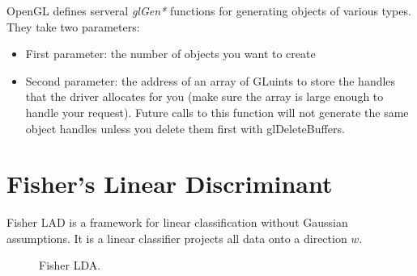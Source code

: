OpenGL defines serveral \textit{glGen*} functions for generating objects of various
types. They take two parameters:
\begin{itemize}
	\item First parameter: the number of objects you want to create
	\item Second parameter: the address of an array of GLuints to store the handles that the driver
	allocates for you (make sure the array is large enough to handle your request). Future calls to this function will not generate the same object handles unless you delete them first with glDeleteBuffers.
\end{itemize} 





\section{Fisher's Linear Discriminant}
 Fisher LAD is a framework for linear classification without Gaussian assumptions. It is a linear classifier projects all data onto a direction $w$.

\begin{figure}[h]
	\caption{Fisher LDA.}
\end{figure}


